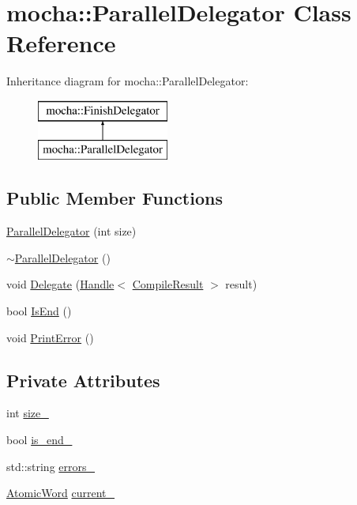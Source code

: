 \hypertarget{classmocha_1_1_parallel_delegator}{
\section{mocha::ParallelDelegator Class Reference}
\label{classmocha_1_1_parallel_delegator}
}
Inheritance diagram for mocha::ParallelDelegator:\begin{figure}[H]
\begin{center}
\leavevmode
\includegraphics[height=2.000000cm]{classmocha_1_1_parallel_delegator}
\end{center}
\end{figure}
\subsection*{Public Member Functions}
\begin{DoxyCompactItemize}
\item 
\hyperlink{classmocha_1_1_parallel_delegator_a7e824ab191578b9d045bb238ddcce194}{ParallelDelegator} (int size)
\item 
\hyperlink{classmocha_1_1_parallel_delegator_aa9dba7e962a6482691ed04b97c3afa3c}{$\sim$ParallelDelegator} ()
\item 
void \hyperlink{classmocha_1_1_parallel_delegator_a7cc8e03175669290ddb4b39ee5e1c1d6}{Delegate} (\hyperlink{classmocha_1_1_handle}{Handle}$<$ \hyperlink{classmocha_1_1_compile_result}{CompileResult} $>$ result)
\item 
bool \hyperlink{classmocha_1_1_parallel_delegator_a58f973cc050ec5408e4c5c3f07eab6f9}{IsEnd} ()
\item 
void \hyperlink{classmocha_1_1_parallel_delegator_aff7624a6debd26da67f79ce450410905}{PrintError} ()
\end{DoxyCompactItemize}
\subsection*{Private Attributes}
\begin{DoxyCompactItemize}
\item 
int \hyperlink{classmocha_1_1_parallel_delegator_a0e515694189bd08d422c720052d21689}{size\_\-}
\item 
bool \hyperlink{classmocha_1_1_parallel_delegator_a526201fcedb64e3d734f5c409f93ecf2}{is\_\-end\_\-}
\item 
std::string \hyperlink{classmocha_1_1_parallel_delegator_a64d6115c334c31c7e35f61c0c1628890}{errors\_\-}
\item 
\hyperlink{atomic_8h_a4fde06794efa6f001ed354067fdd8133}{AtomicWord} \hyperlink{classmocha_1_1_parallel_delegator_ad6a80805f55112ea6d0789dd7fee5b0b}{current\_\-}
\end{DoxyCompactItemize}
